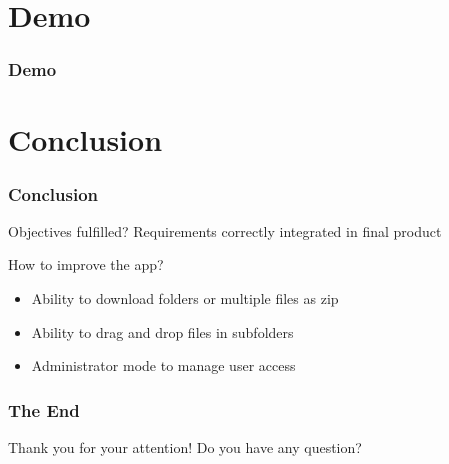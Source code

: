 \documentclass{beamer}
\begin{document}
	\section{Demo}
	\begin{frame}
		\frametitle{Demo}
	\end{frame}
	
	\section{Conclusion}
	\begin{frame}
		\frametitle{Conclusion}
		
		\begin{alertblock}{Objectives fulfilled?}
			Requirements correctly integrated in final product
		\end{alertblock}
		
		\begin{alertblock}{How to improve the app?}
			\begin{itemize}
				\item Ability to download folders or multiple files as zip
				\item Ability to drag and drop files in subfolders
				\item Administrator mode to manage user access
			\end{itemize}
		\end{alertblock}
	\end{frame}
	
	\begin{frame}
		\frametitle{The End}
		
		\centering
		Thank you for your attention!
		\linebreak
		Do you have any question?
	\end{frame}
\end{document}
